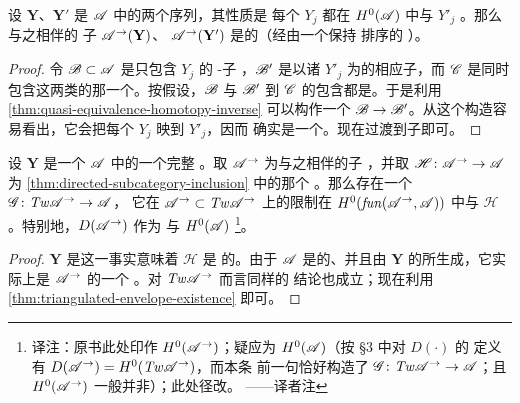 \begin{lemma}\label{thm:directed-collections-quasi-isomorphic}
设 $\mathbf{Y}$、$\mathbf{Y}'$ 是 $\mathscr{A}$ 中\trObject{}的两个序列，其性质是
每个 $Y_j$ 都在 $H^0(\mathscr{A})$ 中与 $Y'_j$ \trIsomorphic。那么与之相伴的%
\trDirected{}子\trCategory{} $\mathscr{A}^{\rightarrow}(\mathbf{Y})$、
$\mathscr{A}^{\rightarrow}(\mathbf{Y}')$ 是\trQuasiisomorphic{}的（经由一个保持%
\trObject{}排序的\trStrictlyUnital{} \trAFunctor）。
\end{lemma}

\begin{proof}
令 $\mathscr{B}\subset\mathscr{A}$ 是只包含\trObject{} $Y_j$ 的\trFull{} \trAinfty-子%
\trCategory，$\mathscr{B}'$ 是以诸 $Y'_j$ 为\trObject{}的相应子\trCategory，而
$\mathscr{C}$ 是同时包含这两类\trObject{}的那一个。按假设，$\mathscr{B}$ 与 $\mathscr{B}'$
到 $\mathscr{C}$ 的包含都是\trQuasiequivalence。于是利用
\cref{thm:quasi-equivalence-homotopy-inverse} 可以构作一个\trQuasiequivalence{}%
$\mathscr{B}\to\mathscr{B}'$。从这个构造容易看出，它会把每个 $Y_j$ 映到 $Y'_j$，因而
确实是一个\trQuasiisomorphism。现在过渡到\trDirected{}子\trCategory{}即可。
\end{proof}
\begin{lemma}\label{thm:directed-derived-equivalence}
设 $\mathbf{Y}$ 是一个\trTriangulated{} \trACategory{} $\mathscr{A}$ 中的一个完整%
\trExceptionalCollection。取 $\mathscr{A}^{\rightarrow}$ 为与之相伴的\trDirected{}子%
\trCategory，并取 $\mathscr{H}\colon\mathscr{A}^{\rightarrow}\to\mathscr{A}$ 为
\cref{thm:directed-subcategory-inclusion} 中的那个 \trAFunctor。那么存在一个%
\trQuasiequivalence{} $\mathscr{G}\colon\mathit{Tw}\mathscr{A}^{\rightarrow}\to\mathscr{A}$，
它在 $\mathscr{A}^{\rightarrow}\subset\mathit{Tw}\mathscr{A}^{\rightarrow}$ 上的限制在
$H^0(\mathit{fun}(\mathscr{A}^{\rightarrow},\mathscr{A}))$ 中与 $\mathscr{H}$
\trIsomorphic。特别地，$D(\mathscr{A}^{\rightarrow})$ 作为\trTriangulated{}%
\trCategory{}与 $H^0(\mathscr{A})$ \trEquivalence\footnote{译注：原书此处印作
$H^0(\mathscr{A}^{\rightarrow})$；疑应为 $H^0(\mathscr{A})$（按 §3 中对 $D(\cdot)$ 的
定义有 $D(\mathscr{A}^{\rightarrow})=H^0(\mathit{Tw}\mathscr{A}^{\rightarrow})$，而本条
前一句恰好构造了\trQuasiequivalence{}%
$\mathscr{G}\colon\mathit{Tw}\mathscr{A}^{\rightarrow}\to\mathscr{A}$；且
$H^0(\mathscr{A}^{\rightarrow})$ 一般并非\trTriangulated{}\trCategory）；此处径改。
——译者注}。
\end{lemma}

\begin{proof}
$\mathbf{Y}$ 是\trExceptionalCollection{}这一事实意味着 $\mathscr{H}$ 是%
\trCohomology\trFullyFaithful{}的。由于 $\mathscr{A}$ 是\trTriangulated{}的、并且由
$\mathbf{Y}$ 的\trObject{}所生成，它实际上是 $\mathscr{A}^{\rightarrow}$ 的一个%
\trTriangulated\trEnvelope。对 $\mathit{Tw}\mathscr{A}^{\rightarrow}$ 而言同样的
结论也成立；现在利用\cref{thm:triangulated-envelope-existence} 即可。
\end{proof}

